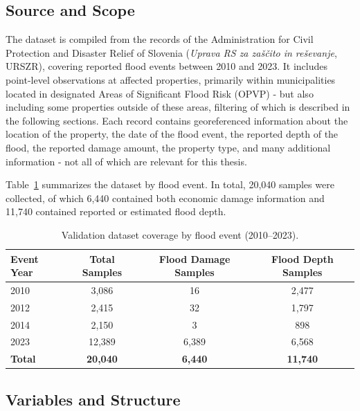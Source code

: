 \subsection{Source and Scope}

The dataset is compiled from the records of the Administration for Civil Protection and Disaster Relief of Slovenia (\textit{Uprava RS za zaščito in reševanje}, URSZR), covering reported flood events between 2010 and 2023.\cite{urszr_damage_data} It includes point-level observations at affected properties, primarily within municipalities located in designated Areas of Significant Flood Risk (OPVP) - but also including some properties outside of these areas, filtering of which is described in the following sections. Each record contains georeferenced information about the location of the property, the date of the flood event, the reported depth of the flood, the reported damage amount, the property type, and many additional information - not all of which are relevant for this thesis.

Table~\ref{tab:validation-events} summarizes the dataset by flood event. In total, 20,040 samples were collected, of which 6,440 contained both economic damage information and 11,740 contained reported or estimated flood depth.

\begin{table}[htb]
    \centering
    \caption{Validation dataset coverage by flood event (2010–2023).}
    \label{tab:validation-events}
    \begin{tabular}{|l|c|c|c|}
        \hline
        \textbf{Event Year} & \textbf{Total Samples} & \textbf{Flood Damage Samples} & \textbf{Flood Depth Samples} \\
        \hline
        2010 & 3,086 & 16 & 2,477 \\
        2012 & 2,415 & 32 & 1,797 \\
        2014 & 2,150 & 3  & 898 \\
        2023 & 12,389 & 6,389 & 6,568 \\
        \hline
        \textbf{Total} & \textbf{20,040} & \textbf{6,440} & \textbf{11,740} \\
        \hline
    \end{tabular}
\end{table}

\subsection{Variables and Structure}


